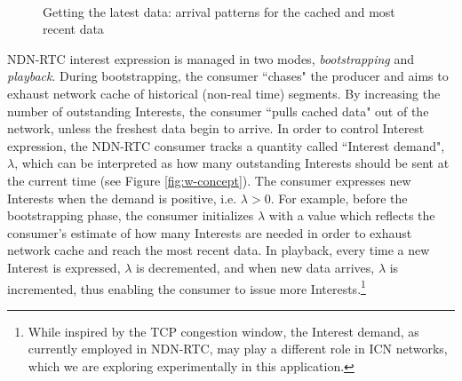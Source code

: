 \documentclass{icn/sig-alternate-2013} %
\newcommand{\ndnrtcName}{NDN-RTC} %
\newcommand{\wConcept}{Interest demand}
\begin{document}


\begin{figure}[t!]
\centering

\\

\caption{Getting the latest data: arrival patterns for the cached and most recent data}
\label{fig:inter-arrival}
\end{figure}

\ndnrtcName{} interest expression is managed in two modes, \textit{bootstrapping} and \textit{playback}.  %
During bootstrapping, the consumer ``chases" the producer and aims to exhaust network cache of historical (non-real time) segments. By increasing the number of outstanding Interests, the consumer ``pulls cached data" out of the network, unless the freshest data begin to arrive.  In order to control Interest expression, the \ndnrtcName{} consumer tracks a quantity called ``\wConcept{}",  $\lambda$, which can be interpreted as how many outstanding Interests should be sent at the current time (see Figure \ref{fig:w-concept}). The consumer expresses new Interests when the demand is positive, i.e. $\lambda > 0$. For example, before the bootstrapping phase, the consumer initializes $\lambda$ with a value which reflects the consumer's estimate of how many Interests are needed in order to exhaust network cache and reach the most recent data. In playback, every time a new Interest is expressed, $\lambda$ is decremented, and when new data arrives, $\lambda$ is incremented, thus enabling the consumer to issue more Interests.\footnote{While inspired by the TCP congestion window, the \wConcept{}, as currently employed in \ndnrtcName{}, may play a different role in ICN networks, which we are exploring experimentally in this application.} 
\end{document}
